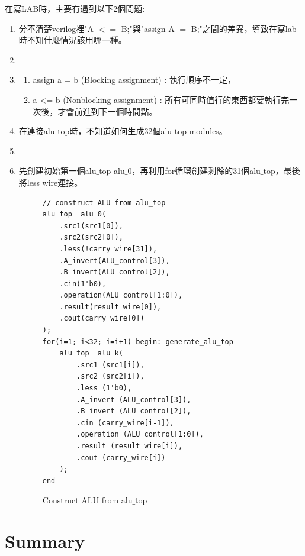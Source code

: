 \documentclass[12pt,a4paper]{article}
\makeatletter
\newtheorem*{solution}{Solution}
\theoremstyle{definition}
\renewenvironment{solution}[1][Solution] {\par\pushQED{\qed}\normalfont\topsep6\p@\@plus6\p@\relax\trivlist\item[\hskip\labelsep\bfseries#1\@addpunct{.}]\ignorespaces}{\popQED\endtrivlist\@endpefalse} \makeatother
\makeatother
\begin{document}
在寫LAB時，主要有遇到以下2個問題:
\begin{enumerate}
\item 分不清楚verilog裡"A $<=$ B;"與"assign A $=$ B;"之間的差異，導致在寫lab時不知什麼情況該用哪一種。
\begin{solution}
\item
\begin{enumerate}
\item assign a = b (Blocking assignment) : 執行順序不一定，
\item a <= b (Nonblocking assignment) : 所有可同時值行的東西都要執行完一次後，才會前進到下一個時間點。
\end{enumerate}
\end{solution}

\item 在連接alu$\_$top時，不知道如何生成32個alu$\_$top modules。
\begin{solution}
\item 先創建初始第一個alu$\_$top alu$\_$0，再利用for循環創建剩餘的31個alu$\_$top，最後將less wire連接。

\begin{figure}[H]
\centering
\begin{lstlisting}[caption={}]
// construct ALU from alu_top
alu_top  alu_0(
    .src1(src1[0]),
    .src2(src2[0]),
    .less(!carry_wire[31]),
    .A_invert(ALU_control[3]),
    .B_invert(ALU_control[2]),
    .cin(1'b0),
    .operation(ALU_control[1:0]),
    .result(result_wire[0]),
    .cout(carry_wire[0])
);
for(i=1; i<32; i=i+1) begin: generate_alu_top
    alu_top  alu_k(
        .src1 (src1[i]),
        .src2 (src2[i]),
        .less (1'b0),
        .A_invert (ALU_control[3]),
        .B_invert (ALU_control[2]),
        .cin (carry_wire[i-1]),
        .operation (ALU_control[1:0]),
        .result (result_wire[i]),
        .cout (carry_wire[i])
    );
end
\end{lstlisting}
\caption{Construct ALU from alu$\_$top}
\label{fig:construct}
\end{figure}
\end{solution}

\end{enumerate}

\section{Summary}
\end{document}
